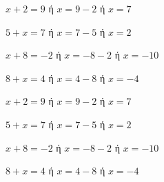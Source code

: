 \begin{alist}
\item $ x+2=9 $ ή $ x=9-2 $ ή $ x=7 $
\item $ 5+x=7 $ ή $ x=7-5 $ ή $ x=2 $
\item $ x+8=-2 $ ή $ x=-8-2 $ ή $ x=-10 $
\item $ 8+x=4 $ ή $ x=4-8 $ ή $ x=-4 $
\end{alist}
\begin{alist}
\item $ x+2=9 $ ή $ x=9-2 $ ή $ x=7 $
\item $ 5+x=7 $ ή $ x=7-5 $ ή $ x=2 $
\item $ x+8=-2 $ ή $ x=-8-2 $ ή $ x=-10 $
\item $ 8+x=4 $ ή $ x=4-8 $ ή $ x=-4 $
\end{alist}
